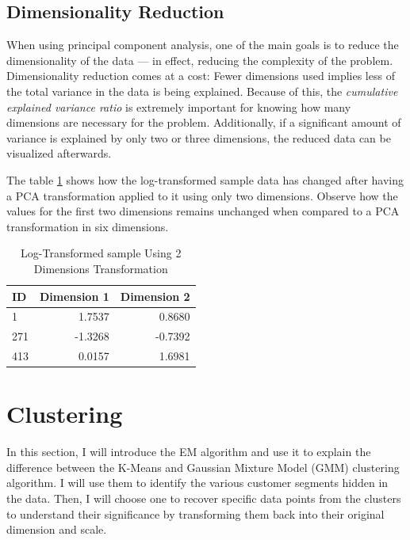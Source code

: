 \documentclass[a4paper]{article}
\begin{document}
\subsection{Dimensionality Reduction}

When using principal component analysis, one of the main goals is to reduce the dimensionality of the data — in effect, reducing the complexity of the problem. Dimensionality reduction comes at a cost: Fewer dimensions used implies less of the total variance in the data is being explained. Because of this, the \textit{cumulative explained variance ratio} is extremely important for knowing how many dimensions are necessary for the problem. Additionally, if a significant amount of variance is explained by only two or three dimensions, the reduced data can be visualized afterwards.

The table \ref{tab:sample_transformed_2} shows how the log-transformed sample data has changed after having a PCA transformation applied to it using only two dimensions. Observe how the values for the first two dimensions remains unchanged when compared to a PCA transformation in six dimensions.

\begin{table}[ht!]
\centering
\begin{tabular}{l|rr}
{ID} &  Dimension 1 &  Dimension 2 \\\hline
1 &       1.7537 &       0.8680 \\
271 &      -1.3268 &      -0.7392 \\
413 &       0.0157 &       1.6981 \\

\end{tabular}
\caption{\label{tab:sample_transformed_2}Log-Transformed sample Using 2 Dimensions Transformation}
\end{table}





\section{Clustering}
\label{sec:clustering}
In this section, I will introduce the EM algorithm and use it to explain the difference between the K-Means and Gaussian Mixture Model (GMM) clustering algorithm. I will use them to identify the various customer segments hidden in the data. Then, I will choose one to recover specific data points from the clusters to understand their significance by transforming them back into their original dimension and scale. 
\end{document}
